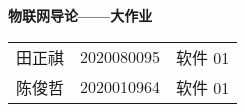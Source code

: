 \begin{center}
    \Large\textbf{物联网导论——大作业}
    \vspace{1em}
    \begin{tabular}{ccc}
        田正祺 & 2020080095 & 软件 01 \\
        陈俊哲 & 2020010964 & 软件 01
    \end{tabular}
\end{center}